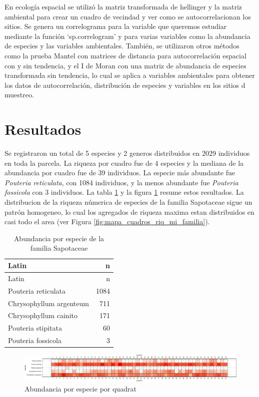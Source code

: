 \documentclass[11pt,]{article}
\begin{document}
En ecología espacial se utilizó la matriz transformada de hellinger y la
matriz ambiental para crear un cuadro de vecindad y ver como se
autocorrelacionan los sitios. Se genera un correlograma para la variable
que queremos estudiar mediante la función `sp.correlogram' y para varias
variables como la abundancia de especies y las variables ambientales.
También, se utilizaron otros métodos como la prueba Mantel con matrices
de distancia para autocorrelación espacial con y sin tendencia, y el I
de Moran con una matriz de abundancia de especies transformada sin
tendencia, lo cual se aplica a variables ambientales para obtener los
datos de autocorrelación, distribución de especies y variables en los
sitios d muestreo.

\section{Resultados}\label{resultados}

Se registraron un total de 5 especies y 2 generos distribuidos en 2029
individuos en toda la parcela. La riqueza por cuadro fue de 4 especies y
la mediana de la abundancia por cuadro fue de 39 individuos. La especie
más abundante fue \emph{Pouteria reticulata}, con 1084 individuos, y la
menos abundante fue \emph{Pouteria fossicola} con 3 individuos. La tabla
\ref{tab:abun_sp} y la figura \ref{fig:abun_sp_q} resume estos
resultados. La distribucion de la riqueza númerica de especies de la
familia Sapotaceae sigue un patrón homogeneo, lo cual los agregados de
riqueza maxima estan distribuidos en casi todo el area (ver Figura
\ref{fig:mapa_cuadros_riq_mi_familia}).

\begin{longtable}[]{@{}lr@{}}
\caption{\label{tab:abun_sp}Abundancia por especie de la familia
Sapotaceae}\tabularnewline
\toprule
Latin & n\tabularnewline
\midrule
\endfirsthead
\toprule
Latin & n\tabularnewline
\midrule
\endhead
Pouteria reticulata & 1084\tabularnewline
Chrysophyllum argenteum & 711\tabularnewline
Chrysophyllum cainito & 171\tabularnewline
Pouteria stipitata & 60\tabularnewline
Pouteria fossicola & 3\tabularnewline
\bottomrule
\end{longtable}

\begin{figure}
\centering
\includegraphics{manuscrito_files/figure-latex/unnamed-chunk-3-1.pdf}
\caption{\label{fig:abun_sp_q}Abundancia por especie por quadrat}
\end{figure}
\end{document}
